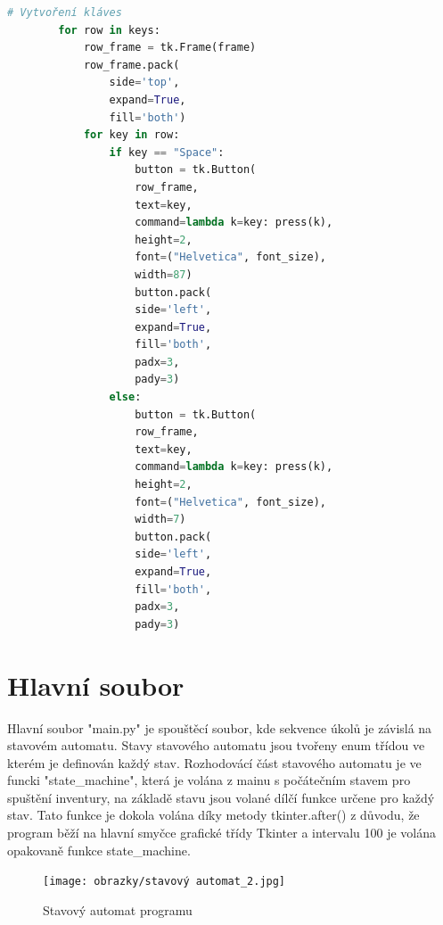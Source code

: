 \begin{lstlisting}[language=Python, caption=Hlavní okno, frame=single]
        # Vytvoření kláves
        for row in keys:
            row_frame = tk.Frame(frame)
            row_frame.pack(
                side='top', 
                expand=True, 
                fill='both')
            for key in row:
                if key == "Space":
                    button = tk.Button(
                    row_frame, 
                    text=key, 
                    command=lambda k=key: press(k), 
                    height=2, 
                    font=("Helvetica", font_size), 
                    width=87)
                    button.pack(
                    side='left', 
                    expand=True, 
                    fill='both', 
                    padx=3, 
                    pady=3)
                else:
                    button = tk.Button(
                    row_frame, 
                    text=key, 
                    command=lambda k=key: press(k), 
                    height=2, 
                    font=("Helvetica", font_size), 
                    width=7)
                    button.pack(
                    side='left', 
                    expand=True, 
                    fill='both', 
                    padx=3, 
                    pady=3)


\end{lstlisting}

\section{Hlavní soubor} %


Hlavní soubor "main.py" je spouštěcí soubor, kde sekvence úkolů je závislá na stavovém automatu. Stavy stavového automatu jsou tvořeny enum třídou ve kterém je definován každý stav. Rozhodovácí část stavového automatu je ve funcki "state\_machine", která je volána z mainu s počátečním stavem pro spuštění inventury, na základě stavu jsou volané dílčí funkce určene pro každý stav. Tato funkce je dokola volána díky metody tkinter.after() z důvodu, že program běží na hlavní smyčce grafické třídy Tkinter a intervalu 100 je volána opakovaně funkce state\_machine.

\begin{figure}[!h]
    \begin{center}
        \texttt{[image: obrazky/stavový automat\_2.jpg]}
    \end{center}
    \caption{Stavový automat programu}
    \label{putty}
\end{figure}

